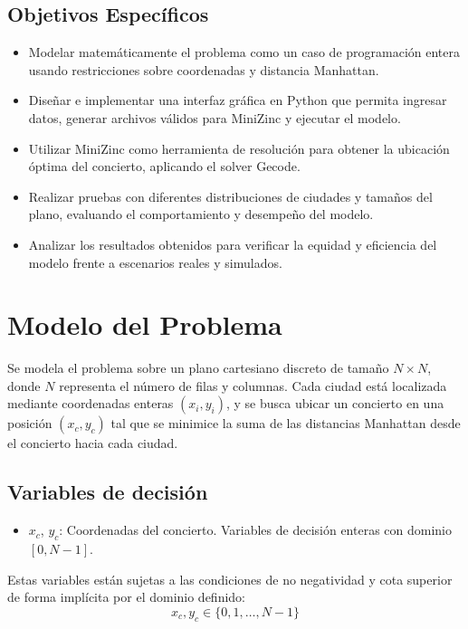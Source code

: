 \documentclass[conference]{IEEEtran}
\begin{document}
\subsection{Objetivos Específicos}
\begin{itemize}
	\item
	Modelar matemáticamente el problema como un caso de programación
	entera usando restricciones sobre coordenadas y distancia Manhattan.
	\item
	Diseñar e implementar una interfaz gráfica en Python que permita
	ingresar datos, generar archivos válidos para MiniZinc y ejecutar el
	modelo.
	\item
	Utilizar MiniZinc como herramienta de resolución para obtener la
	ubicación óptima del concierto, aplicando el solver Gecode.
	\item
	Realizar pruebas con diferentes distribuciones de ciudades y tamaños
	del plano, evaluando el comportamiento y desempeño del modelo.
	\item
	Analizar los resultados obtenidos para verificar la equidad y
	eficiencia del modelo frente a escenarios reales y simulados.
\end{itemize}

\section{Modelo del Problema}

Se modela el problema sobre un plano cartesiano discreto de tamaño $N \times N$, donde $N$ representa el número de filas y columnas. Cada ciudad está localizada mediante coordenadas enteras $(x_i, y_i)$, y se busca ubicar un concierto en una posición $(x_c, y_c)$ tal que se minimice la suma de las distancias Manhattan desde el concierto hacia cada ciudad.

\subsection*{Variables de decisión}

\begin{itemize}
    \item $x_c$, $y_c$: Coordenadas del concierto. Variables de decisión enteras con dominio $[0, N-1]$.
\end{itemize}

Estas variables están sujetas a las condiciones de no negatividad y cota superior de forma implícita por el dominio definido:
\[
x_c, y_c \in \{0, 1, \dots, N-1\}
\]
\end{document}
